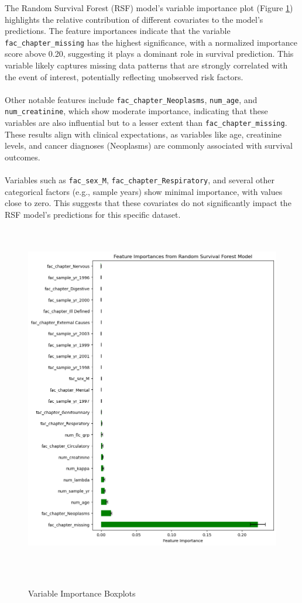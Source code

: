 \noindent The Random Survival Forest (RSF) model's variable importance plot (Figure \ref{fig:var_imp}) highlights the relative contribution of different covariates to the model's predictions. The feature importances indicate that the variable \texttt{fac\_chapter\_missing} has the highest significance, with a normalized importance score above 0.20, suggesting it plays a dominant role in survival prediction. This variable likely captures missing data patterns that are strongly correlated with the event of interest, potentially reflecting unobserved risk factors.
\\\\
\noindent Other notable features include \texttt{fac\_chapter\_Neoplasms}, \texttt{num\_age}, and \texttt{num\_creatinine}, which show moderate importance, indicating that these variables are also influential but to a lesser extent than \texttt{fac\_chapter\_missing}. These results align with clinical expectations, as variables like age, creatinine levels, and cancer diagnoses (Neoplasms) are commonly associated with survival outcomes.
\\\\
\noindent Variables such as \texttt{fac\_sex\_M}, \texttt{fac\_chapter\_Respiratory}, and several other categorical factors (e.g., sample years) show minimal importance, with values close to zero. This suggests that these covariates do not significantly impact the RSF model's predictions for this specific dataset.
\\\\

\begin{figure}[h]
    \centering
    \includegraphics[scale=0.6]{Figures/SURV/rsf_imp.png}
    \caption{Variable Importance Boxplots}
    \label{fig:var_imp}
\end{figure}
\clearpage

